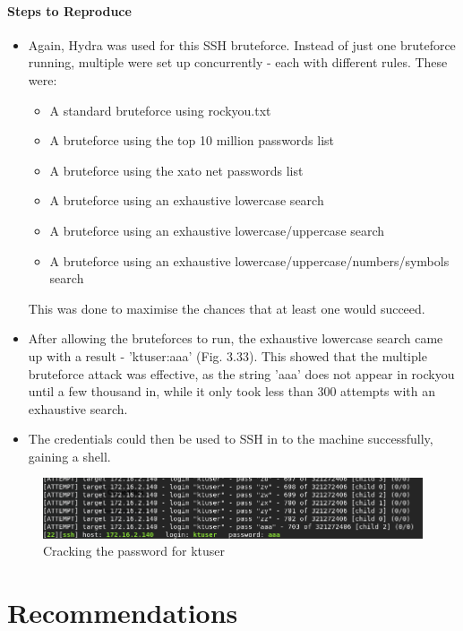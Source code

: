 \documentclass{report}
\begin{document}
\subsubsection{Steps to Reproduce}
\begin{itemize}
	\item Again, Hydra was used for this SSH bruteforce. Instead of just one bruteforce running, multiple were set up concurrently - each with different rules. These were:
	\begin{itemize}
		\item A standard bruteforce using rockyou.txt
		\item A bruteforce using the top 10 million passwords list
		\item A bruteforce using the xato net passwords list
		\item A bruteforce using an exhaustive lowercase search
		\item A bruteforce using an exhaustive lowercase/uppercase search
		\item A bruteforce using an exhaustive lowercase/uppercase/numbers/symbols search
	\end{itemize}
	This was done to maximise the chances that at least one would succeed.
	\item After allowing the bruteforces to run, the exhaustive lowercase search came up with a result - 'ktuser:aaa' (Fig. 3.33). This showed that the multiple bruteforce attack was effective, as the string 'aaa' does not appear in rockyou until a few thousand in, while it only took less than 300 attempts with an exhaustive search.
	\item The credentials could then be used to SSH in to the machine successfully, gaining a shell.
\end{itemize}
\begin{figure}[!htb]
	\centering
	\includegraphics[scale=0.6]{img/140ssh1.png}
	\caption{Cracking the password for ktuser}
\end{figure}





\chapter{Recommendations}
\end{document}

